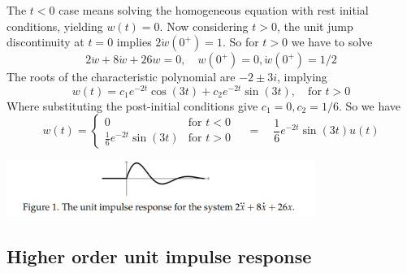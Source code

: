 \documentclass{report}
\begin{document}
The $t<0$ case means solving the homogeneous equation with rest initial conditions, yielding $w(t)=0$. Now
considering $t>0$, the
unit jump discontinuity at $t=0$ implies $2\dot{w}(0^+)=1$. So for $t>0$ we have to solve
\begin{equation*}
2\ddot{w}+8\dot{w}+26w=0,\quad w(0^+)=0,\dot{w}(0^+)=1/2
\end{equation*}
The roots of the characteristic polynomial are $-2\pm3i$, implying
\begin{equation*}
w(t)=c_1e^{-2t}\cos(3t)+c_2e^{-2t}\sin(3t),\quad\text{for }t>0
\end{equation*}
Where substituting the post-initial conditions give $c_1=0,c_2=1/6$. So we have
\begin{equation*}
w(t)=\begin{cases}
0&\text{for }t<0\\
\frac{1}{6}e^{-2t}\sin(3t)&\text{for }t>0
\end{cases}\quad=\quad\frac{1}{6}e^{-2t}\sin(3t)u(t)
\end{equation*}
\begin{center}
\includegraphics[width=10cm]{55}\\
\end{center}
\newpage

\subsection{Higher order unit impulse response}
\end{document}

